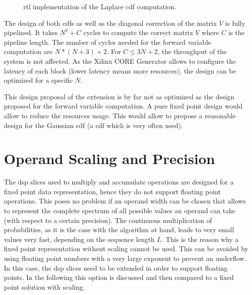\documentclass[mscthesis]{usiinfthesis}
\begin{document}
\begin{figure}
    \centering
    
    \caption{\acrshort{rtl} implementation of the Laplace \acrshort{cdf}
        computation.}
    \label{fig:arch_cdf2}
\end{figure}

The design of both \glspl{cdf} as well as the diagonal correction of the matrix
$V$ is fully pipelined. It takes $N^2+C$ cycles to compute the correct matrix
$V$ where $C$ is the pipeline length. The number of cycles needed for the
forward variable computation are $N*(N+3)+2$. For $C \leq 3N+2$, the throughput
of the system is not affected. As the Xilinx CORE Generator allows to configure
the latency of each block (lower latency means more resources), the design can
be optimized for a specific $N$.

This design proposal of the extension is by far not as optimized as the design
proposed for the forward variable computation. A pure fixed point design
would allow to reduce the resources usage. This would allow to propose
a reasonable design for the Gaussian \gls{cdf} (a \gls{cdf} which is very
often used).

\section{Operand Scaling and Precision}
\label{ch:design_scaling}

The \gls{dsp} slices used to multiply and accumulate operations are designed
for a fixed point data representation, hence they do not support floating point
operations. This poses no problem if an operand width can be chosen that allows
to represent the complete spectrum of all possible values an operand can take
(with respect to a certain precision). The continuous multiplication of
probabilities, as it is the case with the algorithm at hand, leads to very small
values very fast, depending on the sequence length $L$. This is the reason why
a fixed point representation without scaling cannot be used. This can be
avoided by using floating point numbers with a very large exponent to
prevent an underflow. In this case, the \gls{dsp} slices need to be extended in
order to support floating points. In the following this option is discussed and
then compared to a fixed point solution with scaling.
\end{document}
